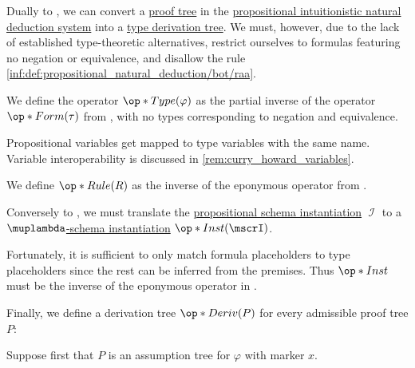 \begin{algorithm}\label{alg:proof_tree_to_type_derivation}
  Dually to , we can convert a \hyperref[def:propositional_natural_deduction_proof_tree]{proof tree} in the \hyperref[def:propositional_natural_deduction]{propositional intuitionistic natural deduction system} into a \hyperref[def:type_derivation_tree]{type derivation tree}. We must, however, due to the lack of established type-theoretic alternatives, restrict ourselves to formulas featuring no negation or equivalence, and disallow the rule \ref{inf:def:propositional_natural_deduction/bot/raa}.

  \begin{thmenum}
     We define the operator \( \op*{Type}(\varphi) \) as the partial inverse of the operator \( \op*{Form}(\tau) \) from , with no types corresponding to negation and equivalence.

    Propositional variables get mapped to type variables with the same name. Variable interoperability is discussed in \cref{rem:curry_howard_variables}.

     We define \( \op*{Rule}(R) \) as the inverse of the eponymous operator from .

     Conversely to , we must translate the \hyperref[alg:propositional_schema_instantiation]{propositional schema instantiation} \( \mscrI \) to a \hyperref[def:atomic_lambda_instantiation]{\( \muplambda \)-schema instantiation} \( \op*{Inst}(\mscrI) \).

    Fortunately, it is sufficient to only match formula placeholders to type placeholders since the rest can be inferred from the premises. Thus \( \op*{Inst} \) must be the inverse of the eponymous operator in .

     Finally, we define a derivation tree \( \op*{Deriv}(P) \) for every admissible proof tree \( P \):
    \begin{thmenum}
       Suppose first that \( P \) is an assumption tree for \( \varphi \) with marker \( x \).


\end{thmenum}
\end{thmenum}
\end{algorithm}

